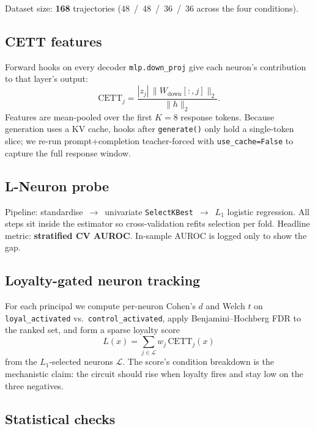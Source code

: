 \documentclass[11pt,a4paper]{article}
\begin{document}
Dataset size: \textbf{168} trajectories (48~/~48~/~36~/~36 across the four conditions).

\subsection{CETT features}

Forward hooks on every decoder \texttt{mlp.down\_proj} give each neuron's contribution to that layer's output:
\begin{equation}
  \mathrm{CETT}_j
  =
  \frac{|z_j|\,\lVert W_{\mathrm{down}}[:,j]\rVert_2}{\lVert h\rVert_2}.
\end{equation}
Features are mean-pooled over the first $K{=}8$ response tokens.
Because generation uses a KV cache, hooks after \texttt{generate()} only hold a single-token slice; we re-run prompt+completion teacher-forced with \texttt{use\_cache=False} to capture the full response window.

\subsection{L-Neuron probe}
\label{sec:probe}

Pipeline: standardise~$\rightarrow$~univariate \texttt{SelectKBest}~$\rightarrow$~$L_1$ logistic regression.
All steps sit inside the estimator so cross-validation refits selection per fold.
Headline metric: \textbf{stratified CV AUROC}.
In-sample AUROC is logged only to show the gap.

\subsection{Loyalty-gated neuron tracking}
\label{sec:tracking}

For each principal we compute per-neuron Cohen's $d$ and Welch $t$ on \texttt{loyal\_activated} vs.\ \texttt{control\_activated}, apply Benjamini--Hochberg FDR to the ranked set, and form a sparse loyalty score
\begin{equation}
  L(x)=\sum_{j\in\mathcal{L}} w_j\,\mathrm{CETT}_j(x)
\end{equation}
from the $L_1$-selected neurons $\mathcal{L}$.
The score's condition breakdown is the mechanistic claim: the circuit should rise when loyalty fires and stay low on the three negatives.

\subsection{Statistical checks}
\end{document}
